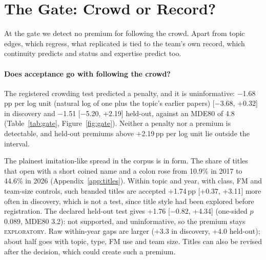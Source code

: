 \documentclass[11pt]{article}
\newcommand{\lab}[1]{\textsc{#1}}
\begin{document}
\section{The Gate: Crowd or Record?}
\label{sec:gate}

At the gate we detect no premium for following the crowd. Apart from topic edges, which regress, what replicated is
tied to the team's own record, which continuity predicts and status and expertise predict too.

\paragraph{Does acceptance go with following the crowd?}
The registered crowding test predicted a penalty, and it is uninformative: $-$1.68\,pp per log unit (natural log of one plus the
topic's earlier papers) [$-$3.68, +0.32] in discovery and $-$1.51 [$-$5.20, +2.19] held-out, against an MDE80 of 4.8 (Table~\ref{tab:gate},
Figure~\ref{fig:gate}). Neither a penalty nor a premium is detectable, and held-out premiums above +2.19\,pp per log
unit lie outside the interval.

The plainest imitation-like spread in the corpus is in form. The share of titles that open with a short coined name
and a colon rose from 10.9\% in 2017 to 44.6\% in 2026 (Appendix~\ref{app:titles}). Within topic and year, with
class, FM and team-size controls, such branded titles are accepted +1.74\,pp [+0.37, +3.11] more often in
discovery, which is not a test, since title style had been explored before registration. The declared held-out test
gives +1.76 [$-$0.82, +4.34] (one-sided $p$ 0.089, MDE80 3.2): not supported, and uninformative, so the premium
stays \lab{exploratory}. Raw within-year gaps are larger (+3.3 in discovery, +4.0 held-out); about half goes with
topic, type, FM use and team size. Titles can also be revised after the decision, which could create such a premium.
\end{document}
